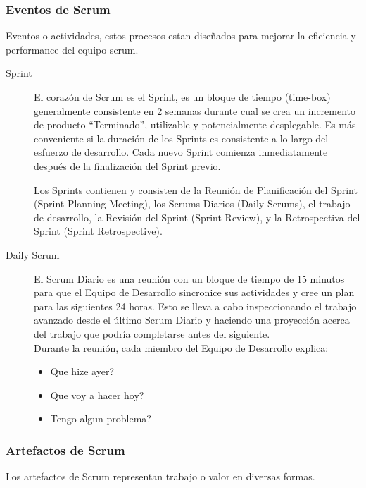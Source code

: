 
      \subsubsection{Eventos de Scrum}
      \label{subs:scrum_events}
      Eventos o actividades, estos procesos estan dise\~nados para mejorar la eficiencia  y performance del equipo scrum.

      \begin{description}
        \item[Sprint]
        El corazón de Scrum es el Sprint, es un bloque de tiempo (time-box) generalmente consistente en 2 semanas durante  cual se crea un incremento de producto “Terminado”, utilizable y potencialmente desplegable. Es más conveniente si la duración de los Sprints es consistente a lo largo del esfuerzo de desarrollo. Cada nuevo Sprint comienza inmediatamente después de la finalización del Sprint previo.

        Los Sprints contienen y consisten de la Reunión de Planificación del Sprint (Sprint Planning Meeting), los Scrums Diarios (Daily Scrums), el trabajo de desarrollo, la Revisión del Sprint (Sprint Review), y la Retrospectiva del Sprint (Sprint Retrospective).

        \item[Daily Scrum]

        El Scrum Diario es una reunión con un bloque de tiempo de 15 minutos para que el Equipo de Desarrollo sincronice sus actividades y cree un plan para las siguientes 24 horas. Esto se lleva a cabo inspeccionando el trabajo avanzado desde el último Scrum Diario y haciendo una proyección acerca del trabajo que podría completarse antes del siguiente. \\
        Durante la reunión, cada miembro del Equipo de Desarrollo explica:
        \begin{itemize}
          \item Que hize ayer?
          \item Que voy a hacer hoy?
          \item Tengo algun problema?
        \end{itemize}

      \end{description}


      \subsubsection{Artefactos de Scrum}
      \label{subs:artefactos_de_scrum}
        Los artefactos de Scrum representan trabajo o valor en diversas formas.


